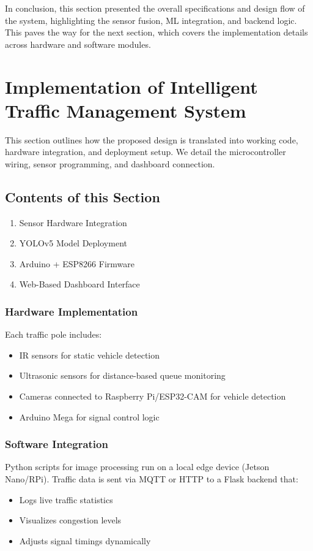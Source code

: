 \documentclass[12pt]{report}
\begin{document}
\vspace{0.5cm}

In conclusion, this section presented the overall specifications and design flow of the system, highlighting the sensor fusion, ML integration, and backend logic. This paves the way for the next section, which covers the implementation details across hardware and software modules.

\chapter{Implementation of Intelligent Traffic Management System}

This section outlines how the proposed design is translated into working code, hardware integration, and deployment setup. We detail the microcontroller wiring, sensor programming, and dashboard connection.

\section{Contents of this Section}
\begin{enumerate}
\item Sensor Hardware Integration
\item YOLOv5 Model Deployment
\item Arduino + ESP8266 Firmware
\item Web-Based Dashboard Interface
\end{enumerate}

\subsection{Hardware Implementation}
Each traffic pole includes:
\begin{itemize}
\item IR sensors for static vehicle detection
\item Ultrasonic sensors for distance-based queue monitoring
\item Cameras connected to Raspberry Pi/ESP32-CAM for vehicle detection
\item Arduino Mega for signal control logic
\end{itemize}

\subsection{Software Integration}
Python scripts for image processing run on a local edge device (Jetson Nano/RPi). Traffic data is sent via MQTT or HTTP to a Flask backend that:
\begin{itemize}
\item Logs live traffic statistics
\item Visualizes congestion levels
\item Adjusts signal timings dynamically
\end{itemize}
\end{document}
